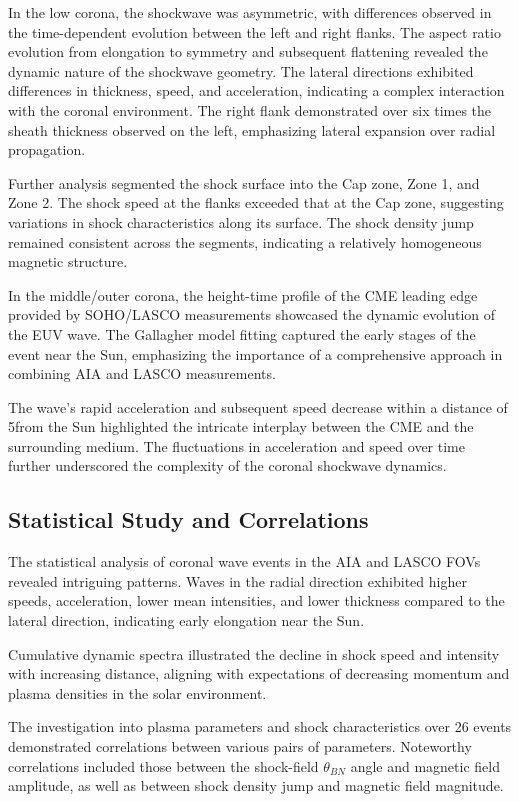 In the low corona, the shockwave was asymmetric, with differences observed in the time-dependent evolution between the left and right flanks. The aspect ratio evolution from elongation to symmetry and subsequent flattening revealed the dynamic nature of the shockwave geometry. The lateral directions exhibited differences in thickness, speed, and acceleration, indicating a complex interaction with the coronal environment. The right flank demonstrated over six times the sheath thickness observed on the left, emphasizing lateral expansion over radial propagation.

Further analysis segmented the shock surface into the Cap zone, Zone 1, and Zone 2. The shock speed at the flanks exceeded that at the Cap zone, suggesting variations in shock characteristics along its surface. The shock density jump remained consistent across the segments, indicating a relatively homogeneous magnetic structure.

In the middle/outer corona, the height-time profile of the CME leading edge provided by SOHO/LASCO measurements showcased the dynamic evolution of the EUV wave. The Gallagher model fitting captured the early stages of the event near the Sun, emphasizing the importance of a comprehensive approach in combining AIA and LASCO measurements.

The wave's rapid acceleration and subsequent speed decrease within a distance of 5\rsun from the Sun highlighted the intricate interplay between the CME and the surrounding medium. The fluctuations in acceleration and speed over time further underscored the complexity of the coronal shockwave dynamics.

\subsection{Statistical Study and Correlations}
The statistical analysis of coronal wave events in the AIA and LASCO FOVs revealed intriguing patterns. Waves in the radial direction exhibited higher speeds, acceleration, lower mean intensities, and lower thickness compared to the lateral direction, indicating early elongation near the Sun.

Cumulative dynamic spectra illustrated the decline in shock speed and intensity with increasing distance, aligning with expectations of decreasing momentum and plasma densities in the solar environment.

The investigation into plasma parameters and shock characteristics over 26 events demonstrated correlations between various pairs of parameters. Noteworthy correlations included those between the shock-field $\theta_{BN}$ angle and magnetic field amplitude, as well as between shock density jump and magnetic field magnitude.

